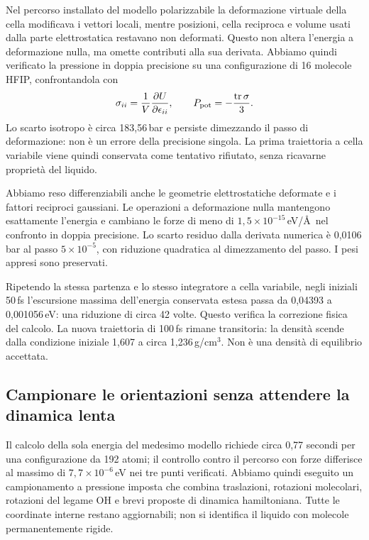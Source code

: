 \documentclass[11pt,reqno]{amsart}
\numberwithin{equation}{section}
\begin{document}
Nel percorso installato del modello polarizzabile la deformazione
virtuale della cella modificava i vettori locali, mentre posizioni,
cella reciproca e volume usati dalla parte elettrostatica restavano
non deformati. Questo non altera l'energia a deformazione nulla,
ma omette contributi alla sua derivata. Abbiamo quindi verificato
la pressione in doppia precisione su una configurazione di
16 molecole HFIP, confrontandola con
\begin{equation}
 \sigma_{ii}=\frac{1}{V}\frac{\partial U}{\partial\epsilon_{ii}},
 \qquad P_{\rm pot}=-\frac{\operatorname{tr}\sigma}{3}.
\end{equation}
Lo scarto isotropo \`e circa 183,56\,bar e persiste dimezzando
il passo di deformazione: non \`e un errore della precisione
singola. La prima traiettoria a cella variabile viene quindi
conservata come tentativo rifiutato, senza ricavarne propriet\`a
del liquido.

Abbiamo reso differenziabili anche le geometrie elettrostatiche
deformate e i fattori reciproci gaussiani. Le operazioni a
deformazione nulla mantengono esattamente l'energia e cambiano
le forze di meno di $1{,}5\times10^{-15}$\,eV/\AA\ nel confronto
in doppia precisione. Lo scarto residuo dalla derivata numerica
\`e 0,0106\,bar al passo $5\times10^{-5}$, con riduzione quadratica
al dimezzamento del passo. I pesi appresi sono preservati.

Ripetendo la stessa partenza e lo stesso integratore a cella
variabile, negli iniziali 50\,fs l'escursione massima dell'energia
conservata estesa passa da 0,04393 a 0,001056\,eV: una riduzione
di circa 42 volte. Questo verifica la correzione fisica del
calcolo. La nuova traiettoria di 100\,fs rimane transitoria:
la densit\`a scende dalla condizione iniziale 1,607 a circa
1,236\,g/cm$^3$. Non \`e una densit\`a di equilibrio accettata.

\subsection{Campionare le orientazioni senza attendere la dinamica lenta}

Il calcolo della sola energia del medesimo modello richiede
circa 0,77 secondi per una configurazione da 192 atomi;
il controllo contro il percorso con forze differisce al massimo
di $7{,}7\times10^{-6}$\,eV nei tre punti verificati.
Abbiamo quindi eseguito un campionamento a pressione imposta
che combina traslazioni, rotazioni molecolari, rotazioni del
legame OH e brevi proposte di dinamica hamiltoniana. Tutte le
coordinate interne restano aggiornabili; non si identifica
il liquido con molecole permanentemente rigide.
\end{document}
